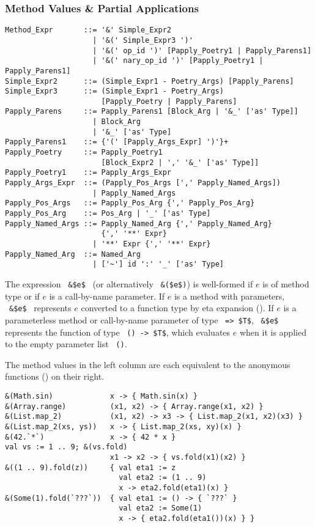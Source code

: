 \subsubsection{Method Values \& Partial Applications}
\label{sec:method-values}

\syntax\begin{lstlisting}
Method_Expr       ::= '&' Simple_Expr2
                    | '&(' Simple_Expr3 ')'
                    | '&(' op_id ')' [Papply_Poetry1 | Papply_Parens1]
                    | '&(' nary_op_id ')' [Papply_Poetry1 | Papply_Parens1]
Simple_Expr2      ::= (Simple_Expr1 - Poetry_Args) [Papply_Parens]
Simple_Expr3      ::= (Simple_Expr1 - Poetry_Args) 
                      [Papply_Poetry | Papply_Parens]
Papply_Parens     ::= Papply_Parens1 [Block_Arg | '&_' ['as' Type]]
                    | Block_Arg 
                    | '&_' ['as' Type]
Papply_Parens1    ::= {'(' [Papply_Args_Expr] ')'}+ 
Papply_Poetry     ::= Papply_Poetry1 
                      [Block_Expr2 | ',' '&_' ['as' Type]]
Papply_Poetry1    ::= Papply_Args_Expr
Papply_Args_Expr  ::= (Papply_Pos_Args [',' Papply_Named_Args])
                    | Papply_Named_Args
Papply_Pos_Args   ::= Papply_Pos_Arg {',' Papply_Pos_Arg}
Papply_Pos_Arg    ::= Pos_Arg | '_' ['as' Type]
Papply_Named_Args ::= Papply_Named_Arg {',' Papply_Named_Arg}
                      {',' '**' Expr}
                    | '**' Expr {',' '**' Expr}
Papply_Named_Arg  ::= Named_Arg
                    | ['~'] id ':' '_' ['as' Type]
\end{lstlisting}

The expression ~\lstinline!&$e$!~ (or alternatively ~\lstinline!&($e$)!) is well-formed if $e$ is of method type or if $e$ is a call-by-name parameter. If $e$ is a method with parameters, ~\lstinline!&$e$!~ represents $e$ converted to a function type by eta expansion (). If $e$ is a parameterless method or call-by-name parameter of type ~\lstinline!=> $T$!, ~\lstinline!&$e$!~ represents the function of type ~\lstinline!() -> $T$!, which evaluates $e$ when it is applied to the empty parameter list ~\lstinline!()!. 

\example The method values in the left column are each equivalent to the anonymous functions () on their right. 
\begin{lstlisting}[deletekeywords={range}]
&(Math.sin)             x -> { Math.sin(x) }
&(Array.range)          (x1, x2) -> { Array.range(x1, x2) }
&(List.map_2)           (x1, x2) -> x3 -> { List.map_2(x1, x2)(x3) }
&(List.map_2(xs, ys))   x -> { List.map_2(xs, xy)(x) }
&(42.`*`)               x -> { 42 * x }
val vs := 1 .. 9; &(vs.fold)
                        x1 -> x2 -> { vs.fold(x1)(x2) }
&((1 .. 9).fold(z))     { val eta1 := z 
                          val eta2 := (1 .. 9)
                          x -> eta2.fold(eta1)(x) }
&(Some(1).fold(`???`))  { val eta1 := () -> { `???` }
                          val eta2 := Some(1)
                          x -> { eta2.fold(eta1())(x) } }
\end{lstlisting}

